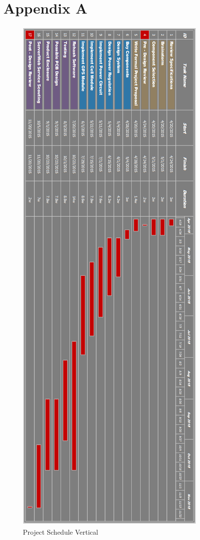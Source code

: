 \documentclass[11pt]{article}
\begin{document}
\pagebreak
\section{Appendix A}
\begin{figure}[H]
   \centering
       \includegraphics[scale=0.55]{senior_project_gantt_vert.png}
   \caption{Project Schedule Vertical}
   \label{fig:gantt_vertical}
\end{figure}
\end{document}
